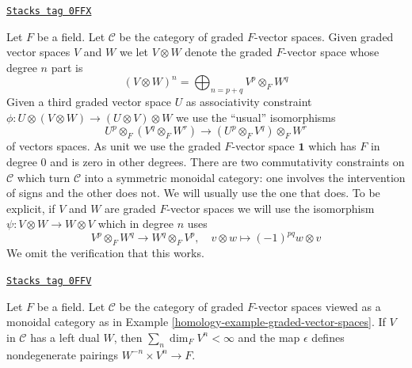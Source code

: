 \begin{example}
\label{homology-example-graded-vector-spaces}
\href{https://stacks.math.columbia.edu/tag/0FFX}{\texttt{Stacks tag 0FFX}}

Let $F$ be a field. Let $\mathcal{C}$ be the category of graded
$F$-vector spaces. Given graded vector spaces $V$ and $W$ we
let $V \otimes W$ denote the graded $F$-vector space whose
degree $n$ part is
$$
(V \otimes W)^n = \bigoplus\nolimits_{n = p + q} V^p \otimes_F W^q
$$
Given a third graded vector space $U$ as associativity constraint
$\phi : U \otimes (V \otimes W) \to (U \otimes V) \otimes W$
we use the ``usual'' isomorphisms
$$
U^p \otimes_F (V^q \otimes_F W^r) \to (U^p \otimes_F V^q) \otimes_F W^r
$$
of vectors spaces. As unit we use the graded $F$-vector space $\mathbf{1}$
which has $F$ in degree $0$ and is zero in other degrees.
There are two commutativity constraints on $\mathcal{C}$
which turn $\mathcal{C}$ into a symmetric monoidal category: one involves the
intervention of signs and the other does not. We will usually
use the one that does. To be explicit, if $V$ and $W$ are graded $F$-vector
spaces we will use the isomorphism $\psi : V \otimes W \to W \otimes V$
which in degree $n$ uses
$$
V^p \otimes_F W^q \to W^q \otimes_F V^p,\quad
v \otimes w \mapsto (-1)^{pq} w \otimes v
$$
We omit the verification that this works.
\end{example}

\begin{lemma}
\label{homology-lemma-left-dual-graded-vector-spaces}
\href{https://stacks.math.columbia.edu/tag/0FFV}{\texttt{Stacks tag 0FFV}}

Let $F$ be a field. Let $\mathcal{C}$ be the category of graded
$F$-vector spaces viewed as a monoidal category as in
Example \ref{homology-example-graded-vector-spaces}. If $V$ in $\mathcal{C}$
has a left dual $W$, then $\sum_n \dim_F V^n < \infty$
and the map $\epsilon$ defines nondegenerate pairings
$W^{-n} \times V^n \to F$.
\end{lemma}

